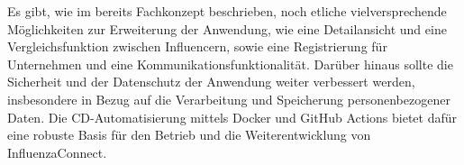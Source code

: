\documentclass[conference,a4paper,flushend]{cs-techrep}
\begin{document}
Es gibt, wie im bereits Fachkonzept beschrieben, noch etliche vielversprechende Möglichkeiten zur Erweiterung der Anwendung, wie eine Detailansicht und eine Vergleichsfunktion zwischen Influencern, sowie eine Registrierung für Unternehmen und eine Kommunikationsfunktionalität. Darüber hinaus sollte die Sicherheit und der Datenschutz der Anwendung weiter verbessert werden, insbesondere in Bezug auf die Verarbeitung und Speicherung personenbezogener Daten. Die CD-Automatisierung mittels Docker und GitHub Actions bietet dafür eine robuste Basis für den Betrieb und die Weiterentwicklung von InfluenzaConnect. 







\nocite{ModA-TR-2023SS-WAE-TeamWeiss-Neunerln}
\nocite{ModA-TR-2023SS-BDCC-TeamRot-CompVisPipeline}
\nocite{ModA-TR-2023SS-BDCC-TeamBlau-NauticalNonsense}
\nocite{ModA-TR-2023SS-BCN-TeamGruen-TorpedoTactics}
\nocite{ModA-TR-2023SS-BCN-TeamCyan-Stockbird}
\nocite{ModA-TR-2023SS-BCN-TeamBlau-FancyChess}
\nocite{ModA-TR-2023WS-SWT-TeamRot-SGDb}
\nocite{ModA-TR-2023WS-SWT-TeamGruen-OPCUANetzwerk}
\nocite{ModA-TR-2022SS-WAE-TeamWeiss-WoIstMeinGeld}
\nocite{ModA-TR-2022SS-BDCC-TeamWeiss-TwitterDash}
\nocite{ModA-TR-2022SS-BDCC-TeamRot-Reddiment}
\nocite{ModA-TR-2022SS-BDCC-TeamGruen-ExplosionGuy}
\nocite{ModA-TR-2022SS-BDCC-TeamCyan-OTHWiki}
\nocite{ModA-TR-2022WS-SWT-TeamGruen-Graphvio}
\nocite{ModA-TR-2021SS-WAE-TeamWeiss-CovidDashboard}
\nocite{ModA-TR-2021SS-WAE-TeamRot-FireForceDefense}
\nocite{ModA-TR-2021SS-WAE-TeamGruen-MedPlanner}

\sloppy
\printbibliography[notcategory=selfref]
\end{document}
